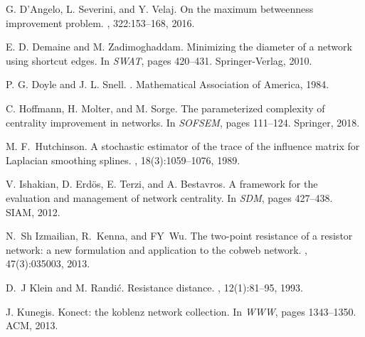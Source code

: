 \documentclass{article}
\begin{document}
\begin{thebibliography}{}
G. D'Angelo, L. Severini, and Y. Velaj.
\newblock On the maximum betweenness improvement problem.
, 322:153--168,
  2016.

E. D. Demaine and M. Zadimoghaddam.
\newblock Minimizing the diameter of a network using shortcut edges.
\newblock In {\em SWAT}, pages 420--431. Springer-Verlag, 2010.

P. G. Doyle and J. L. Snell.
.
\newblock Mathematical Association of America, 1984.

C. Hoffmann, H. Molter, and M. Sorge.
\newblock The parameterized complexity of centrality improvement in networks.
\newblock In {\em SOFSEM}, pages 111--124. Springer, 2018.

M. F.~Hutchinson.
\newblock A stochastic estimator of the trace of the influence matrix for
  {L}aplacian smoothing splines.
,
  18(3):1059--1076, 1989.

V. Ishakian, D. Erd{\"o}s, E. Terzi, and A. Bestavros.
\newblock A framework for the evaluation and management of network centrality.
\newblock In {\em SDM}, pages 427--438. SIAM, 2012.

N.~Sh Izmailian, R.~Kenna, and FY~Wu.
\newblock The two-point resistance of a resistor network: a new formulation and
  application to the cobweb network.
,
  47(3):035003, 2013.

D.~J Klein and M. Randi{\'c}.
\newblock Resistance distance.
, 12(1):81--95, 1993.

J. Kunegis.
\newblock Konect: the koblenz network collection.
\newblock In {\em WWW}, pages 1343--1350. ACM, 2013.


\end{thebibliography}
\end{document}
